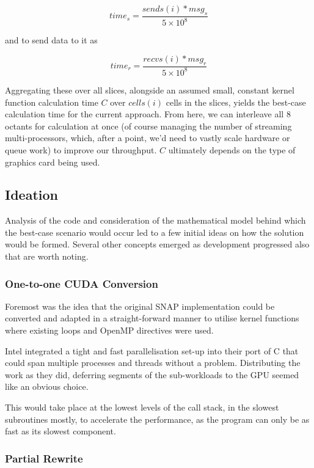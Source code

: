 \documentclass[conference]{IEEEtran}
\begin{document}
\begin{equation}
time_s = \frac{sends(i) * msg_s}{5 \times 10^8}
\end{equation}

and to send data to it as

\begin{equation}
time_r = \frac{recvs(i) * msg_r}{5 \times 10^8}
\end{equation}

Aggregating these over all slices, alongside an assumed small, constant kernel function calculation time $ C $ over $ cells(i) $ cells in the slices, yields the best-case calculation time for the current approach. From here, we can interleave all 8 octants for calculation at once (of course managing the number of streaming multi-processors, which, after a point, we'd need to vastly scale hardware or queue work) to improve our throughput. $C$ ultimately depends on the type of graphics card being used.

\subsection{Ideation}
\label{sec:ideation}

Analysis of the code and consideration of the mathematical model behind which the best-case scenario would occur led to a few initial ideas on how the solution would be formed. Several other concepts emerged as development progressed also that are worth noting.


\subsubsection{One-to-one CUDA Conversion}

Foremost was the idea that the original SNAP implementation could be converted and adapted in a straight-forward manner to utilise kernel functions where existing loops and OpenMP directives were used.

Intel integrated a tight and fast parallelisation set-up into their port of C that could span multiple processes and threads without a problem. Distributing the work as they did, deferring segments of the sub-workloads to the GPU seemed like an obvious choice.

This would take place at the lowest levels of the call stack, in the slowest subroutines mostly, to accelerate the performance, as the program can only be as fast as its slowest component.


\subsubsection{Partial Rewrite}
\end{document}
